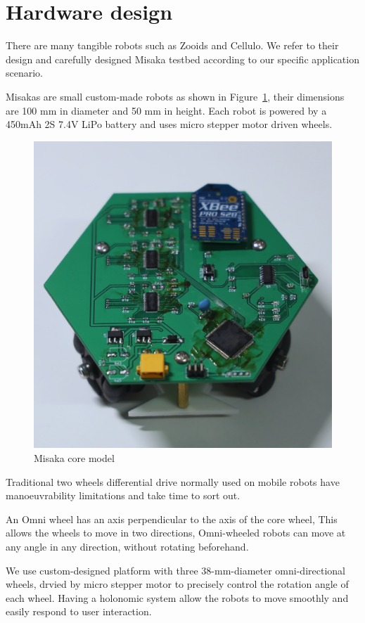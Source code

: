 \documentclass[conference]{IEEEtran}
\begin{document}





\section{Hardware design}

There are many tangible robots such as Zooids\cite{le2016zooids} and Cellulo\cite{ozgur2017cellulo}. We refer to their design and carefully designed Misaka testbed according to our specific application scenario.


Misakas are small custom-made robots as shown in Figure~\ref{fig:model}, their dimensions are 100 mm in diameter and 50 mm in height. Each robot is powered by a 450mAh 2S 7.4V LiPo battery and uses micro stepper motor driven wheels.

\begin{figure}[htbp]
    \centering
    \includegraphics[width=0.6\columnwidth]{model.jpg}
    \caption{Misaka core model}
    \label{fig:model}
\end{figure}

Traditional two wheels differential drive normally used on mobile robots have manoeuvrability limitations and take time to sort out\cite{ribeiro2004three}. 

An Omni wheel has an axis perpendicular to the axis of the core wheel, This allows the wheels to move in two directions, Omni-wheeled robots can move at any angle in any direction, without rotating beforehand.

We use custom-designed platform with three 38-mm-diameter omni-directional wheels, drvied by micro stepper motor to precisely control the rotation angle of each wheel. Having a holonomic system allow the robots to move smoothly and easily respond to user interaction.
\end{document}
